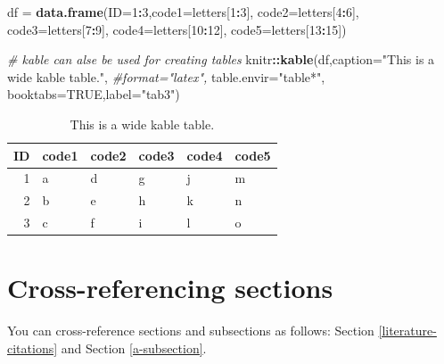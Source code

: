 \documentclass[webpdf,large,modern,namedate]{oup-authoring-template}
\newenvironment{Shaded}{\begin{snugshade}}{\end{snugshade}}
\newcommand{\AttributeTok}[1]{\textcolor[rgb]{0.13,0.29,0.53}{#1}}
\newcommand{\CommentTok}[1]{\textcolor[rgb]{0.56,0.35,0.01}{\textit{#1}}}
\newcommand{\ConstantTok}[1]{\textcolor[rgb]{0.56,0.35,0.01}{#1}}
\newcommand{\DecValTok}[1]{\textcolor[rgb]{0.00,0.00,0.81}{#1}}
\newcommand{\FunctionTok}[1]{\textcolor[rgb]{0.13,0.29,0.53}{\textbf{#1}}}
\newcommand{\NormalTok}[1]{#1}
\newcommand{\OtherTok}[1]{\textcolor[rgb]{0.56,0.35,0.01}{#1}}
\newcommand{\SpecialCharTok}[1]{\textcolor[rgb]{0.81,0.36,0.00}{\textbf{#1}}}
\newcommand{\StringTok}[1]{\textcolor[rgb]{0.31,0.60,0.02}{#1}}
\theoremstyle{thmstyleone}
\theoremstyle{thmstyletwo}
\theoremstyle{thmstylethree}
\begin{document}
\begin{Shaded}
\begin{Highlighting}[]
\NormalTok{df }\OtherTok{=} \FunctionTok{data.frame}\NormalTok{(}\AttributeTok{ID=}\DecValTok{1}\SpecialCharTok{:}\DecValTok{3}\NormalTok{,}\AttributeTok{code1=}\NormalTok{letters[}\DecValTok{1}\SpecialCharTok{:}\DecValTok{3}\NormalTok{],}
                \AttributeTok{code2=}\NormalTok{letters[}\DecValTok{4}\SpecialCharTok{:}\DecValTok{6}\NormalTok{],}
                \AttributeTok{code3=}\NormalTok{letters[}\DecValTok{7}\SpecialCharTok{:}\DecValTok{9}\NormalTok{],}
                \AttributeTok{code4=}\NormalTok{letters[}\DecValTok{10}\SpecialCharTok{:}\DecValTok{12}\NormalTok{],}
                \AttributeTok{code5=}\NormalTok{letters[}\DecValTok{13}\SpecialCharTok{:}\DecValTok{15}\NormalTok{])}

\CommentTok{\# kable can alse be used for creating tables}
\NormalTok{knitr}\SpecialCharTok{::}\FunctionTok{kable}\NormalTok{(df,}\AttributeTok{caption=}\StringTok{"This is a wide kable table."}\NormalTok{,}
             \CommentTok{\#format="latex",}
             \AttributeTok{table.envir=}\StringTok{"table*"}\NormalTok{,}
             \AttributeTok{booktabs=}\ConstantTok{TRUE}\NormalTok{,}\AttributeTok{label=}\StringTok{"tab3"}\NormalTok{)}
\end{Highlighting}
\end{Shaded}

\begin{table}

\caption{\label{tab:tab3}This is a wide kable table.}
\centering
\begin{tabular}[t]{rlllll}
\toprule
ID & code1 & code2 & code3 & code4 & code5\\
\midrule
1 & a & d & g & j & m\\
2 & b & e & h & k & n\\
3 & c & f & i & l & o\\
\bottomrule
\end{tabular}
\end{table}

\hypertarget{cross-referencing-sections}{%
\section{Cross-referencing sections}\label{cross-referencing-sections}}

You can cross-reference sections and subsections as follows: Section
\ref{literature-citations} and Section \ref{a-subsection}.
\end{document}
